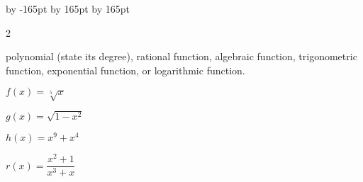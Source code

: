 \documentclass{sebase}
\newenvironment{instructions}{\STARTINSTR}{\ENDINSTR}
\begin{document}
\setlength{\columnsep}{24pt}
\advance \leftskip by -165pt
\advance\hsize by 165pt
\advance\linewidth by 165pt
\begin{multicols}{2}%

\begin{instructions}
\hspace{9pt}\newline
{\small polynomial (state its degree), rational function, algebraic
function, }\newline
{\small trigonometric function, exponential function, or logarithmic }%
\newline
{\small function.}
\end{instructions}

\begin{ExerciseList}
\item[$\hfill $1.] 

\begin{ExerciseList}
\item[(a)] $f(x)=\sqrt[5]{x}$\qquad 
%

\item[(b)] $g(x)=\sqrt{1-x^{2}}$\qquad 
%

\item[(c)] $h(x)=x^{9}+x^{4}$\qquad 
%

\item[(d)] $r(x)=\dfrac{x^{2}+1}{x^{3}+x}$\qquad 
%


\end{ExerciseList}
\end{ExerciseList}
\end{multicols}
\end{document}

